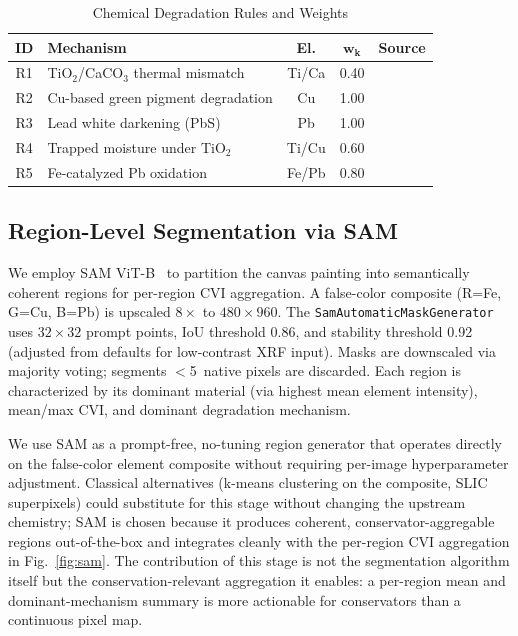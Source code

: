 \documentclass[conference]{IEEEtran}
\begin{document}
\begin{table}[t]
\centering
\caption{Chemical Degradation Rules and Weights}
\label{tab:rules}
\renewcommand{\arraystretch}{1.05}
\footnotesize
\begin{tabularx}{\columnwidth}{@{}cJccc@{}}
\toprule
\textbf{ID} & \textbf{Mechanism} & \textbf{El.} & $\boldsymbol{w_k}$ & \textbf{Source} \\
\midrule
R1 & TiO$_2$/CaCO$_3$ thermal mismatch   & Ti/Ca & 0.40 & \cite{mora1984conservation} \\
R2 & Cu-based green pigment degradation  & Cu    & 1.00 & \cite{scott2002copper} \\
R3 & Lead white darkening (PbS)          & Pb    & 1.00 & \cite{cotte2006blackening} \\
R4 & Trapped moisture under TiO$_2$      & Ti/Cu & 0.60 & \cite{schiessl1998incompatibility} \\
R5 & Fe-catalyzed Pb oxidation           & Fe/Pb & 0.80 & \cite{gonzalez2017lead} \\
\bottomrule
\end{tabularx}
\end{table}

\subsection{Region-Level Segmentation via SAM}

We employ SAM ViT-B~\cite{kirillov2023segment} to partition the canvas painting into semantically coherent regions for per-region CVI aggregation. A false-color composite (R=Fe, G=Cu, B=Pb) is upscaled $8\times$ to $480 \times 960$. The \texttt{SamAutomaticMaskGenerator} uses $32{\times}32$ prompt points, IoU threshold 0.86, and stability threshold 0.92 (adjusted from defaults for low-contrast XRF input). Masks are downscaled via majority voting; segments $<$5~native pixels are discarded. Each region is characterized by its dominant material (via highest mean element intensity), mean/max CVI, and dominant degradation mechanism.

We use SAM as a prompt-free, no-tuning region generator that operates directly on the false-color element composite without requiring per-image hyperparameter adjustment. Classical alternatives (k-means clustering on the composite, SLIC superpixels) could substitute for this stage without changing the upstream chemistry; SAM is chosen because it produces coherent, conservator-aggregable regions out-of-the-box and integrates cleanly with the per-region CVI aggregation in Fig.~\ref{fig:sam}. The contribution of this stage is not the segmentation algorithm itself but the conservation-relevant aggregation it enables: a per-region mean and dominant-mechanism summary is more actionable for conservators than a continuous pixel map.
\end{document}
